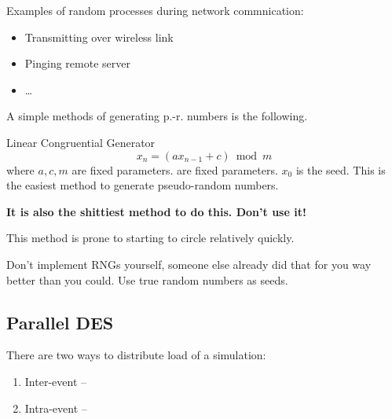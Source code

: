 \documentclass[english]{panikzettel}
\newcommand{\alert}[1]{\textbf{\textcolor{red!75!black}{#1}}}
\begin{document}
	Examples of random processes during network commnication:
	\begin{itemize}
		\item Transmitting over wireless link
		\item Pinging remote server
		\item \dots
	\end{itemize}

	A simple methods of generating p.-r. numbers is the following.

	\begin{defi}{Linear Congruential Generator}
		\[
			x_n = (ax_{n-1} + c) \bmod m
		\]
		where \( a, c, m \) are fixed parameters. are fixed parameters.
		\( x_{0} \) is the seed.
		\tcblower
		This is the easiest method to generate pseudo-random numbers.	

		\alert{It is also the shittiest method to do this. Don't use it!} 
	\end{defi}

	This method is prone to starting to circle relatively quickly.
	
	Don't implement RNGs yourself, someone else already did that for you way better than you could. 
	Use true random numbers as seeds.
	
	
	\subsection{Parallel DES}
	\label{ss:discrete-event-simulation:parallel-des}
	
	There are two ways to distribute load of a simulation:
	\begin{enumerate}
		\item Inter-event – 
		\item Intra-event –  
	\end{enumerate}
	
\end{document}
